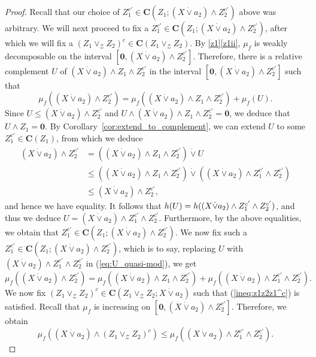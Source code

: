 \documentclass[a4paper,11pt,reqno]{article}
\theoremstyle{definition}
\newcommand{\zero}{{\mathbf{0}}}
\begin{document}
\begin{proof}
Recall that our choice of $Z_1^{c'}\in\mathbf{C}(Z_1;(X\dot\vee a_2)\wedge Z_2^{c'})$ above was arbitrary. We will next proceed to fix a $Z_1^{c'}\in\mathbf{C}(Z_1;(X\dot\vee a_2)\wedge Z_2^{c'})$, after which we will fix a $(Z_1\vee_\mathcal{Z}Z_2)^c\in\mathbf{C}(Z_1\vee_\mathcal{Z}Z_2)$.
By \ref{z1}\ref{z1ii}, $\mu_f$ is weakly decomposable on the interval $[\zero,(X\dot\vee a_2)\wedge Z_2^{c'}]$. Therefore, there is a relative complement $U$ of $(X\dot\vee a_2)\wedge Z_1\wedge Z_2^{c'}$ in the interval $[\zero,(X\dot\vee a_2)\wedge Z_2^{c'}]$ such that 
\begin{equation}\label{eq:U_quasi-mod}
    \mu_f((X\dot\vee a_2)\wedge Z_2^{c'})=\mu_f((X\dot\vee a_2)\wedge Z_1\wedge Z_2^{c'})+\mu_f(U).
\end{equation}
Since $U\leq(X\dot\vee a_2)\wedge Z_2^{c'}$ and $U\wedge(X\dot\vee a_2)\wedge Z_1\wedge Z_2^{c'}=\zero$, we deduce that $U\wedge Z_1=\zero$. By Corollary~\ref{cor:extend_to_complement}, we can extend $U$ to some $Z_1^{c'}\in\mathbf{C}(Z_1)$, from which we deduce
\begin{align*}
    (X\dot\vee a_2)\wedge Z_2^{c'}&=((X\dot\vee a_2)\wedge Z_1\wedge Z_2^{c'})\dot\vee U\\
    &\leq ((X\dot\vee a_2)\wedge Z_1\wedge Z_2^{c'})\dot\vee((X\dot\vee a_2)\wedge Z_1^{c'}\wedge Z_2^{c'})\\
    &\leq (X\dot\vee a_2)\wedge Z_2^{c'},
\end{align*}
and hence we have equality. It follows that $\textup{h}(U)=\textup{h}((X\dot\vee a_2)\wedge Z_1^{c'}\wedge Z_2^{c'})$, and thus we deduce $U=(X\dot\vee a_2)\wedge Z_1^{c'}\wedge Z_2^{c'}$. Furthermore, by the above equalities, we obtain that $Z_1^{c'}\in\mathbf{C}(Z_1;(X\dot\vee a_2)\wedge Z_2^{c'})$. We now fix such a $Z_1^{c'}\in\mathbf{C}(Z_1;(X\dot\vee a_2)\wedge Z_2^{c'})$, which is to say, replacing $U$ with $(X\dot\vee a_2)\wedge Z_1^{c'}\wedge Z_2^{c'}$ in (\ref{eq:U_quasi-mod}), we get
\begin{equation}\label{eq:z1'_split}
    \mu_f((X\dot\vee a_2)\wedge Z_2^{c'})=\mu_f((X\dot\vee a_2)\wedge Z_1\wedge Z_2^{c'})+\mu_f((X\dot\vee a_2)\wedge Z_1^{c'}\wedge Z_2^{c'}).
\end{equation}
We now fix $(Z_1\vee_\mathcal{Z}Z_2)^c\in\mathbf{C}(Z_1\vee_\mathcal{Z}Z_2;X\dot\vee a_2)$ such that (\ref{ineq:z1z2z1^c}) is satisfied. Recall that $\mu_f$ is increasing on $[\zero,(X\dot\vee a_2)\wedge Z_2^{c'}]$. Therefore, we obtain
\begin{equation}\label{eq:eim_request}
    \mu_f((X\dot\vee a_2)\wedge(Z_1\vee_\mathcal{Z}Z_2)^c)\leq\mu_f((X\dot\vee a_2)\wedge Z_1^{c'}\wedge Z_2^{c'}).
\end{equation}


\end{proof}
\end{document}
